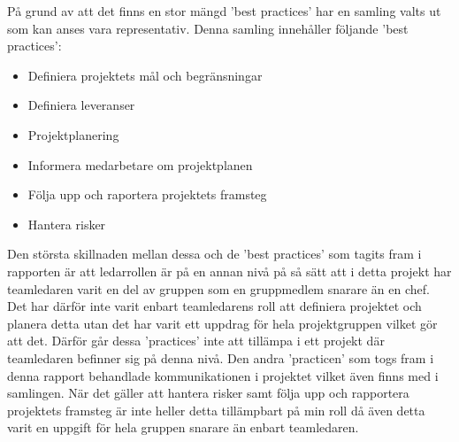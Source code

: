 På grund av att det finns en stor mängd 'best practices' har en samling valts ut som kan anses vara representativ. Denna samling innehåller följande 'best practices':
\begin{itemize}
	\item Definiera projektets mål och begränsningar
	\item Definiera leveranser
	\item Projektplanering
	\item Informera medarbetare om projektplanen
	\item Följa upp och raportera projektets framsteg
	\item Hantera risker
\end{itemize}
Den största skillnaden mellan dessa och de 'best practices' som tagits fram i rapporten är att ledarrollen är på en annan nivå på så sätt att i detta projekt har teamledaren varit en del av gruppen som en gruppmedlem snarare än en chef. Det har därför inte varit enbart teamledarens roll att definiera projektet och planera detta utan det har varit ett uppdrag för hela projektgruppen vilket gör att det. Därför går dessa 'practices' inte att tillämpa i ett projekt där teamledaren befinner sig på denna nivå. Den andra 'practicen' som togs fram i denna rapport behandlade kommunikationen i projektet vilket även finns med i samlingen. När det gäller att hantera risker samt följa upp och rapportera projektets framsteg är inte heller detta tillämpbart på min roll då även detta varit en uppgift för hela gruppen snarare än enbart teamledaren\citep{psmart}.

